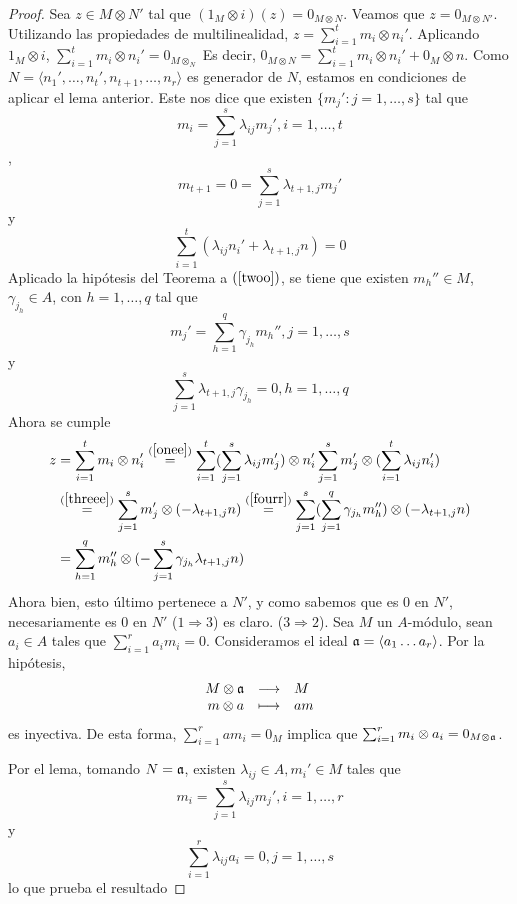 \documentclass[../main.tex]{subfiles}
\begin{document}
\begin{proof}
	Sea $z\in M\otimes N'$ tal que $(1_M\otimes i)(z)=0_{M\otimes N}$. Veamos que $z=0_{M\otimes N'}$. Utilizando las propiedades de multilinealidad, $z=\sum_{i=1}^tm_i\otimes n_i'$. Aplicando $1_M\otimes i$, $\sum_{i=1}^tm_i\otimes n_i'=0_{M\otimes_N}$ Es decir, $0_{M\otimes N}=\sum_{i=1}^tm_i\otimes n_i'+0_M\otimes n$. Como $N=\langle n_1',\dots,n_t',n_{t+1},\dots,n_r\rangle$ es generador de $N$, estamos en condiciones de aplicar el lema anterior. Este nos dice que existen $\{m_j':j=1,\dots,s\}$ tal que \begin{equation} \label{onee}
	m_i=\sum_{j=1}^s\lambda_{ij}m_j', i=1,\dots,t
	\end{equation}, \begin{equation} \label{twoo}
	m_{t+1}=0=\sum_{j=1}^s\lambda_{t+1,j}m_j'
	\end{equation} y \begin{equation} \label{threee}
	\sum_{i=1}^t(\lambda_{ij}n_i'+\lambda_{t+1,j}n)=0
	\end{equation} Aplicado la hipótesis del Teorema a $(\ref{twoo})$, se tiene que existen $m_h''\in M$, $\gamma_{j_h}\in A$, con $h=1,\dots,q$ tal que \begin{equation} \label{fourr}
	m_j'=\sum_{h=1}^q\gamma_{j_h}m_h'', j=1,\dots,s
	\end{equation} y \begin{equation} \label{fivee}
	\sum_{j=1}^s\lambda_{t+1,j}\gamma_{j_h}=0, h=1,\dots,q    \end{equation}
	Ahora se cumple
	\begin{align*}
	z&=\sum_{i=1}^tm_i\otimes n_i'\overset{(\ref{onee})}{=}\sum_{i=1}^t(\sum_{j=1}^s\lambda_{ij}m_j')\otimes n_i'\sum_{j=1}^sm_j'\otimes(\sum_{i=1}^t\lambda_{ij}n_i')\\
	&\overset{(\ref{threee})}{=}\sum_{j=1}^sm_j'\otimes(-\lambda_{t+1,j}n)\overset{(\ref{fourr})}{=}\sum_{j=1}^s(\sum_{j=1}^q\gamma_{j_h}m_h'')\otimes (-\lambda_{t+1,j}n)\\
	&=\sum_{h=1}^qm_h''\otimes(-\sum_{j=1}^s\gamma_{j_h}\lambda_{t+1,j}n)
	\end{align*}
	Ahora bien, esto último pertenece a $N'$, y como sabemos que es $0$ en $N'$, necesariamente es $0$ en $N'$
	($1\Rightarrow3$) es claro.
	($3\Rightarrow2$). Sea $M$ un $A$-módulo, sean $a_i\in A$ tales que $\sum_{i=1}^ra_im_i=0$. Consideramos el ideal $\mathfrak{a}=\langle a_1\dots a_r\rangle$. Por la hipótesis,
	$$\begin{array}{rcl}
	M\otimes\mathfrak{a}&\longrightarrow&M  \\
	m\otimes a&\longmapsto&am
	\end{array}$$ es inyectiva. De esta forma, $\sum_{i=1}^ram_i=0_M$ implica que $\sum_{i=1}^rm_i\otimes a_i=0_{M\otimes\mathfrak{a}}$.

	Por el lema, tomando $N=\mathfrak{a}$, existen $\lambda_{ij}\in A, m_i'\in M$ tales que $$m_i=\sum_{j=1}^s\lambda_{ij}m_j', i=1,\dots,r$$ y $$\sum_{i=1}^r\lambda_{ij}a_i=0, j=1,\dots,s$$ lo que prueba el resultado
\end{proof}
\end{document}
